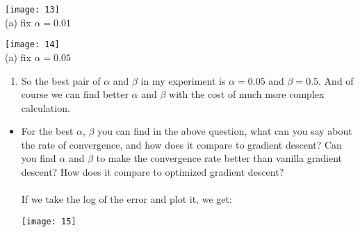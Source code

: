 \documentclass[11pt,letterpaper]{article}
\begin{document}
\begin{tcolorbox}
    \begin{center}
            \texttt{[image: 13]}\\
            (a) fix $\alpha = 0.01$
    \end{center}
    \begin{center}
            \texttt{[image: 14]}\\
            (a) fix $\alpha = 0.05$
    \end{center}
    \begin{enumerate}[\quad\quad]
        \item So the best pair of $\alpha$ and $\beta$ in my experiment is $\alpha=0.05$ and $\beta=0.5$. And of course we can find better $\alpha$ and $\beta$ with the cost of much more complex calculation.
    \end{enumerate}
    \bigskip
    \begin{itemize}
        \item For the best $\alpha$, $\beta$ you can find in the above question, what can you say about the rate of convergence, and how does it compare to gradient descent? Can you find $\alpha$ and $\beta$ to make the convergence rate better than vanilla gradient descent? How does it compare to optimized gradient descent?
        \\\\
        If we take the log of the error and plot it, we get:
        \begin{center}
            \texttt{[image: 15]}
        \end{center}
    \end{itemize}
\end{tcolorbox}

\newpage
\end{document}
